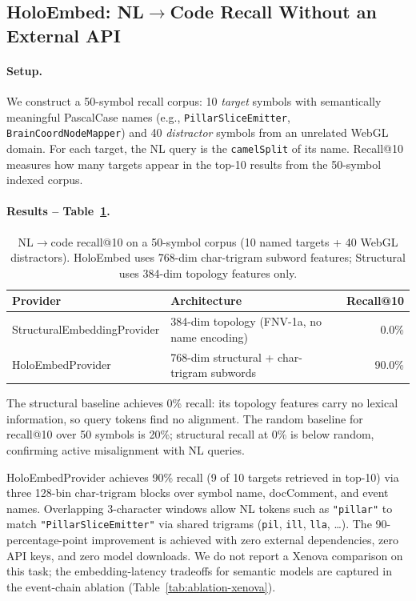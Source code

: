 \subsection{HoloEmbed: NL$\to$Code Recall Without an External API}
\label{sec:eval-holoembed}

\paragraph{Setup.}
We construct a 50-symbol recall corpus: 10 \emph{target} symbols with
semantically meaningful PascalCase names (e.g., \texttt{PillarSliceEmitter},
\texttt{BrainCoordNodeMapper}) and 40 \emph{distractor} symbols from an
unrelated WebGL domain.  For each target, the NL query is the
\texttt{camelSplit} of its name.  Recall@10 measures how many targets appear
in the top-10 results from the 50-symbol indexed corpus.

\paragraph{Results -- Table~\ref{tab:holoembed-recall}.}

\begin{table}[h]
\centering
\caption{NL$\to$code recall@10 on a 50-symbol corpus (10 named targets + 40
  WebGL distractors).  HoloEmbed uses 768-dim char-trigram subword features;
  Structural uses 384-dim topology features only.}
\label{tab:holoembed-recall}
\begin{tabular}{llr}
\toprule
Provider & Architecture & Recall@10 \\
\midrule
StructuralEmbeddingProvider & 384-dim topology (FNV-1a, no name encoding) & 0.0\% \\
HoloEmbedProvider           & 768-dim structural + char-trigram subwords  & 90.0\% \\
\bottomrule
\end{tabular}
\end{table}

\noindent
The structural baseline achieves 0\% recall: its topology features carry no
lexical information, so query tokens find no alignment.  The random baseline
for recall@10 over 50 symbols is 20\%; structural recall at 0\% is below
random, confirming active misalignment with NL queries.

HoloEmbedProvider achieves 90\% recall (9 of 10 targets retrieved in top-10)
via three 128-bin char-trigram blocks over symbol name, docComment, and event
names.  Overlapping 3-character windows allow NL tokens such as
\texttt{"pillar"} to match \texttt{"PillarSliceEmitter"} via shared trigrams
(\texttt{pil}, \texttt{ill}, \texttt{lla}, \ldots).  The 90-percentage-point
improvement is achieved with zero external dependencies, zero API keys, and
zero model downloads.  We do not report a Xenova comparison on this task; the
embedding-latency tradeoffs for semantic models are captured in the
event-chain ablation (Table~\ref{tab:ablation-xenova}).

